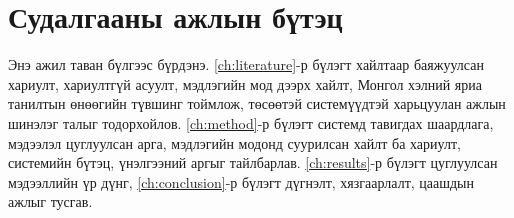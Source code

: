 \section{Судалгааны ажлын бүтэц}
\label{sec:intro-structure}

Энэ ажил таван бүлгээс бүрдэнэ. \ref{ch:literature}-р бүлэгт хайлтаар баяжуулсан хариулт, хариултгүй асуулт, мэдлэгийн мод дээрх хайлт, Монгол хэлний яриа танилтын өнөөгийн түвшинг тоймлож, төсөөтэй системүүдтэй харьцуулан ажлын шинэлэг талыг тодорхойлов. \ref{ch:method}-р бүлэгт системд тавигдах шаардлага, мэдээлэл цуглуулсан арга, мэдлэгийн модонд суурилсан хайлт ба хариулт, системийн бүтэц, үнэлгээний аргыг тайлбарлав. \ref{ch:results}-р бүлэгт цуглуулсан мэдээллийн үр дүнг, \ref{ch:conclusion}-р бүлэгт дүгнэлт, хязгаарлалт, цаашдын ажлыг тусгав.
